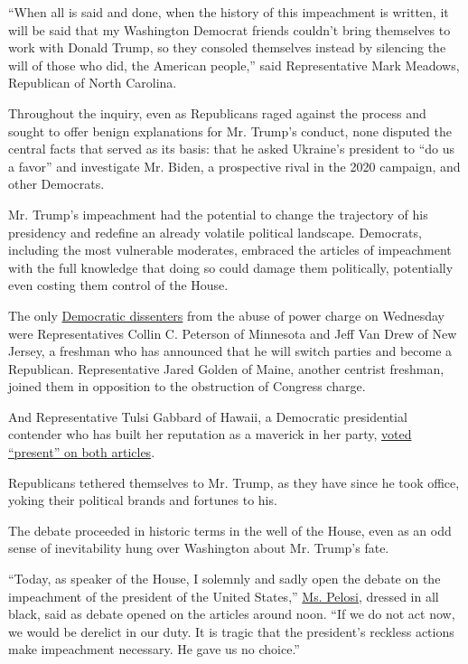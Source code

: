 ``When all is said and done, when the history of this impeachment is
written, it will be said that my Washington Democrat friends couldn't
bring themselves to work with Donald Trump, so they consoled themselves
instead by silencing the will of those who did, the American people,''
said Representative Mark Meadows, Republican of North Carolina.

Throughout the inquiry, even as Republicans raged against the process
and sought to offer benign explanations for Mr. Trump's conduct, none
disputed the central facts that served as its basis: that he asked
Ukraine's president to ``do us a favor'' and investigate Mr. Biden, a
prospective rival in the 2020 campaign, and other Democrats.

Mr. Trump's impeachment had the potential to change the trajectory of
his presidency and redefine an already volatile political landscape.
Democrats, including the most vulnerable moderates, embraced the
articles of impeachment with the full knowledge that doing so could
damage them politically, potentially even costing them control of the
House.

The only
\href{https://www.nytimes.com/2019/12/18/us/politics/how-democrats-voted-on-impeaching-trump.html}{Democratic
dissenters} from the abuse of power charge on Wednesday were
Representatives Collin C. Peterson of Minnesota and Jeff Van Drew of New
Jersey, a freshman who has announced that he will switch parties and
become a Republican. Representative Jared Golden of Maine, another
centrist freshman, joined them in opposition to the obstruction of
Congress charge.

And Representative Tulsi Gabbard of Hawaii, a Democratic presidential
contender who has built her reputation as a maverick in her party,
\href{https://www.nytimes.com/2019/12/18/us/elections/tulsi-gabbard-impeachment-vote.html}{voted
``present'' on both articles}.

Republicans tethered themselves to Mr. Trump, as they have since he took
office, yoking their political brands and fortunes to his.

The debate proceeded in historic terms in the well of the House, even as
an odd sense of inevitability hung over Washington about Mr. Trump's
fate.

``Today, as speaker of the House, I solemnly and sadly open the debate
on the impeachment of the president of the United States,''
\href{https://www.nytimes.com/2019/12/18/us/politics/nancy-pelosi.html}{Ms.
Pelosi}, dressed in all black, said as debate opened on the articles
around noon. ``If we do not act now, we would be derelict in our duty.
It is tragic that the president's reckless actions make impeachment
necessary. He gave us no choice.''

